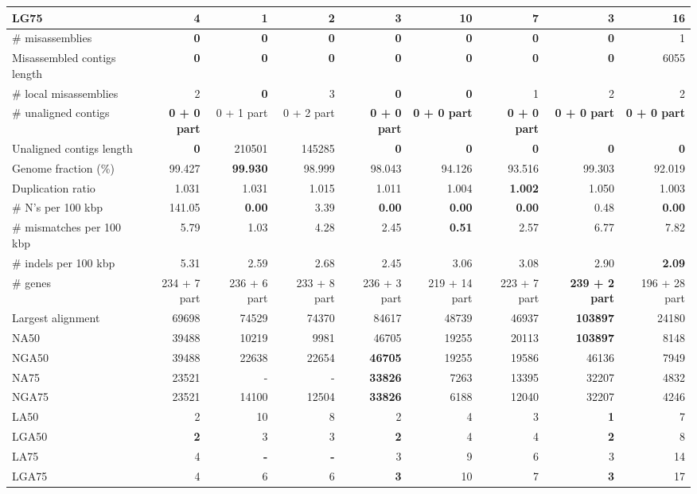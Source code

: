 \documentclass[12pt,a4paper]{article}
\begin{document}
\begin{table}[ht]
\begin{center}
\begin{tabular}{|l*{8}{|r}|}
LG75 & 4 & {\bf 1} & 2 & 3 & 10 & 7 & 3 & 16 \\ \hline
\# misassemblies & {\bf 0} & {\bf 0} & {\bf 0} & {\bf 0} & {\bf 0} & {\bf 0} & {\bf 0} & 1 \\ \hline
Misassembled contigs length & {\bf 0} & {\bf 0} & {\bf 0} & {\bf 0} & {\bf 0} & {\bf 0} & {\bf 0} & 6055 \\ \hline
\# local misassemblies & 2 & {\bf 0} & 3 & {\bf 0} & {\bf 0} & 1 & 2 & 2 \\ \hline
\# unaligned contigs & {\bf 0 + 0 part} & 0 + 1 part & 0 + 2 part & {\bf 0 + 0 part} & {\bf 0 + 0 part} & {\bf 0 + 0 part} & {\bf 0 + 0 part} & {\bf 0 + 0 part} \\ \hline
Unaligned contigs length & {\bf 0} & 210501 & 145285 & {\bf 0} & {\bf 0} & {\bf 0} & {\bf 0} & {\bf 0} \\ \hline
Genome fraction (\%) & 99.427 & {\bf 99.930} & 98.999 & 98.043 & 94.126 & 93.516 & 99.303 & 92.019 \\ \hline
Duplication ratio & 1.031 & 1.031 & 1.015 & 1.011 & 1.004 & {\bf 1.002} & 1.050 & 1.003 \\ \hline
\# N's per 100 kbp & 141.05 & {\bf 0.00} & 3.39 & {\bf 0.00} & {\bf 0.00} & {\bf 0.00} & 0.48 & {\bf 0.00} \\ \hline
\# mismatches per 100 kbp & 5.79 & 1.03 & 4.28 & 2.45 & {\bf 0.51} & 2.57 & 6.77 & 7.82 \\ \hline
\# indels per 100 kbp & 5.31 & 2.59 & 2.68 & 2.45 & 3.06 & 3.08 & 2.90 & {\bf 2.09} \\ \hline
\# genes & 234 + 7 part & 236 + 6 part & 233 + 8 part & 236 + 3 part & 219 + 14 part & 223 + 7 part & {\bf 239 + 2 part} & 196 + 28 part \\ \hline
Largest alignment & 69698 & 74529 & 74370 & 84617 & 48739 & 46937 & {\bf 103897} & 24180 \\ \hline
NA50 & 39488 & 10219 & 9981 & 46705 & 19255 & 20113 & {\bf 103897} & 8148 \\ \hline
NGA50 & 39488 & 22638 & 22654 & {\bf 46705} & 19255 & 19586 & 46136 & 7949 \\ \hline
NA75 & 23521 & - & - & {\bf 33826} & 7263 & 13395 & 32207 & 4832 \\ \hline
NGA75 & 23521 & 14100 & 12504 & {\bf 33826} & 6188 & 12040 & 32207 & 4246 \\ \hline
LA50 & 2 & 10 & 8 & 2 & 4 & 3 & {\bf 1} & 7 \\ \hline
LGA50 & {\bf 2} & 3 & 3 & {\bf 2} & 4 & 4 & {\bf 2} & 8 \\ \hline
LA75 & 4 & {\bf -} & {\bf -} & 3 & 9 & 6 & 3 & 14 \\ \hline
LGA75 & 4 & 6 & 6 & {\bf 3} & 10 & 7 & {\bf 3} & 17 \\ \hline
\end{tabular}
\end{center}
\end{table}
\end{document}
